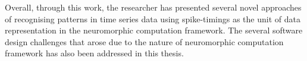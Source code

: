 Overall, through this work, the researcher has presented several novel approaches of recognising patterns in time series data using spike-timings as the unit of data representation in the neuromorphic computation framework. The several software design challenges that arose due to the nature of neuromorphic computation framework has also been addressed in this thesis.      

